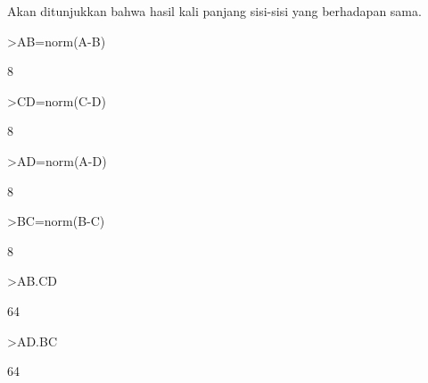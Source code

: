 \documentclass[a4paper,10pt]{article}
\begin{document}
\begin{eulernotebook}
\begin{eulercomment}
\begin{eulercomment}
\begin{eulercomment}
\begin{eulercomment}
\begin{eulercomment}
\begin{eulercomment}
\begin{eulercomment}
\begin{eulercomment}
\begin{eulercomment}
\begin{eulercomment}
\begin{eulercomment}
\begin{eulercomment}
\begin{eulercomment}
\begin{eulercomment}
\begin{eulercomment}
\begin{eulercomment}
\begin{eulercomment}
\begin{eulercomment}
\begin{eulercomment}
\begin{eulercomment}
\begin{eulercomment}
\begin{eulercomment}
\begin{eulercomment}
\begin{eulercomment}
\begin{eulercomment}
\begin{eulercomment}
\begin{eulercomment}
\begin{eulercomment}
\begin{eulercomment}
\begin{eulercomment}
\begin{eulercomment}
\begin{eulercomment}
\begin{eulercomment}
\begin{eulercomment}
\begin{eulercomment}
\begin{eulercomment}
\begin{eulercomment}
\begin{eulercomment}
\begin{eulercomment}
\begin{eulercomment}
\begin{eulercomment}
\begin{eulercomment}
\begin{eulercomment}
Akan ditunjukkan bahwa hasil kali panjang sisi-sisi yang berhadapan
sama.
\end{eulercomment}
\begin{eulerprompt}
>AB=norm(A-B)
\end{eulerprompt}
\begin{euleroutput}
  8
\end{euleroutput}
\begin{eulerprompt}
>CD=norm(C-D)
\end{eulerprompt}
\begin{euleroutput}
  8
\end{euleroutput}
\begin{eulerprompt}
>AD=norm(A-D)
\end{eulerprompt}
\begin{euleroutput}
  8
\end{euleroutput}
\begin{eulerprompt}
>BC=norm(B-C)
\end{eulerprompt}
\begin{euleroutput}
  8
\end{euleroutput}
\begin{eulerprompt}
>AB.CD
\end{eulerprompt}
\begin{euleroutput}
  64
\end{euleroutput}
\begin{eulerprompt}
>AD.BC
\end{eulerprompt}
\begin{euleroutput}
  64
\end{euleroutput}

\end{eulercomment}
\end{eulercomment}
\end{eulercomment}
\end{eulercomment}
\end{eulercomment}
\end{eulercomment}
\end{eulercomment}
\end{eulercomment}
\end{eulercomment}
\end{eulercomment}
\end{eulercomment}
\end{eulercomment}
\end{eulercomment}
\end{eulercomment}
\end{eulercomment}
\end{eulercomment}
\end{eulercomment}
\end{eulercomment}
\end{eulercomment}
\end{eulercomment}
\end{eulercomment}
\end{eulercomment}
\end{eulercomment}
\end{eulercomment}
\end{eulercomment}
\end{eulercomment}
\end{eulercomment}
\end{eulercomment}
\end{eulercomment}
\end{eulercomment}
\end{eulercomment}
\end{eulercomment}
\end{eulercomment}
\end{eulercomment}
\end{eulercomment}
\end{eulercomment}
\end{eulercomment}
\end{eulercomment}
\end{eulercomment}
\end{eulercomment}
\end{eulercomment}
\end{eulercomment}
\end{eulernotebook}
\end{document}

